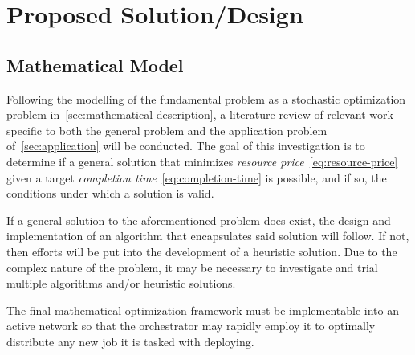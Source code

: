 \documentclass[../mthe-493-project-proposal.tex]{subfiles}
\begin{document}
    \chapter{Proposed Solution/Design}
    \label{ch:proposed-design}

    \section{Mathematical Model}
    Following the modelling of the fundamental problem as a stochastic optimization problem in~\autoref{sec:mathematical-description}, a literature review of relevant work specific to both the general problem and the application problem of~\autoref{sec:application} will be conducted. The goal of this investigation is to determine if a general solution that minimizes \textit{resource price}~\eqref{eq:resource-price} given a target \textit{completion time}~\eqref{eq:completion-time} is possible, and if so, the conditions under which a solution is valid.
    
    If a general solution to the aforementioned problem does exist, the design and implementation of an algorithm that encapsulates said solution will follow. If not, then efforts will be put into the development of a heuristic solution. Due to the complex nature of the problem, it may be necessary to investigate and trial multiple algorithms and/or heuristic solutions.
    
    The final mathematical optimization framework must be implementable into an active network so that the orchestrator may rapidly employ it to optimally distribute any new job it is tasked with deploying. 
    
\end{document}
